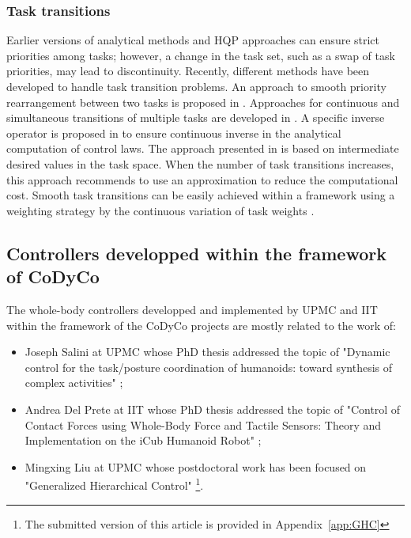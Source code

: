 \documentclass[12pt,a4paper,twoside]{article}
\begin{document}

\subsubsection{Task transitions}
Earlier versions of analytical methods and HQP approaches can ensure strict priorities among tasks; however, a change in the task set, such as a swap of task priorities, may lead to discontinuity. Recently, different methods have been developed to handle task transition problems.
An approach to smooth priority rearrangement between two tasks is proposed in \cite{Keith11,Petric13}. Approaches for continuous and simultaneous transitions of multiple tasks are developed in \cite{Mansard09bis,Lee12}. A specific inverse operator is proposed  in \cite{Mansard09bis} to ensure continuous inverse in the analytical computation of control laws. The approach presented in \cite{Lee12} is based on intermediate desired values in the task space. When the number of task transitions increases, this approach recommends to use an approximation to reduce the computational cost.
Smooth task transitions can be easily achieved within a framework using a weighting strategy by the continuous variation of task weights \cite{Salini11}.

\subsection{Controllers developped within the framework of CoDyCo}

The whole-body controllers developped and implemented by UPMC and IIT  within the framework of the CoDyCo projects are mostly related to the work of:
\begin{itemize}
\item Joseph Salini at UPMC whose PhD thesis addressed the topic of "Dynamic control for the task/posture coordination of humanoids: toward synthesis of complex activities" \cite{Salini12};
\item Andrea Del Prete at IIT whose PhD thesis addressed the topic of "Control of Contact Forces using Whole-Body Force and Tactile Sensors: Theory and Implementation on the iCub Humanoid Robot" \cite{DelPreteThesis2013};
\item Mingxing Liu at UPMC whose postdoctoral work has been focused on "Generalized Hierarchical Control" \cite{generalizedsm}\footnote{The submitted version of this article is provided in Appendix~\ref{app:GHC}}.
\end{itemize}
\end{document}
